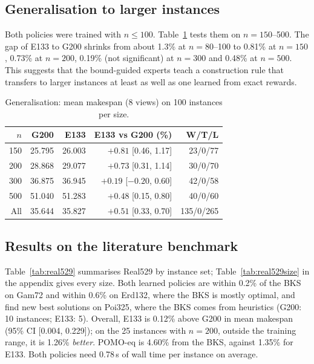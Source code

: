 \documentclass[preprint,review,12pt,authoryear]{elsarticle}
\begin{document}
\subsection{Generalisation to larger instances}\label{sec:generalisation}
Both policies were trained with $n\le100$. Table~\ref{tab:general} tests them on $n=150$--500. The gap of
E133 to G200 shrinks from about 1.3\% at $n=80$--100 to 0.81\% at $n=150$, 0.73\% at $n=200$, 0.19\% (not
significant) at $n=300$ and 0.48\% at $n=500$. This suggests that the bound-guided experts teach a
construction rule that transfers to larger instances at least as well as one learned from exact rewards.

\begin{table}[t]\centering\small
\caption{Generalisation: mean makespan (8 views) on 100 instances per size.}\label{tab:general}
\begin{tabular}{rrrrr}
\toprule
$n$ & G200 & E133 & E133 vs G200 (\%) & W/T/L \\
\midrule
150 & 25.795 & 26.003 & $+0.81$ [0.46, 1.17] & 23/0/77 \\
200 & 28.868 & 29.077 & $+0.73$ [0.31, 1.14] & 30/0/70 \\
300 & 36.875 & 36.945 & $+0.19$ [$-0.20$, 0.60] & 42/0/58 \\
500 & 51.040 & 51.283 & $+0.48$ [0.15, 0.80] & 40/0/60 \\
\midrule
All & 35.644 & 35.827 & $+0.51$ [0.33, 0.70] & 135/0/265 \\
\bottomrule
\end{tabular}
\end{table}

\subsection{Results on the literature benchmark}\label{sec:real529}
Table~\ref{tab:real529} summarises Real529 by instance set; Table~\ref{tab:real529size} in the appendix gives
every size. Both learned policies are within 0.2\% of the BKS on Gam72 and within 0.6\% on Erd132, where the BKS
is mostly optimal, and find new best solutions on Poi325, where the BKS comes from heuristics (G200: 10
instances; E133: 5). Overall, E133 is 0.12\% above G200 in mean makespan (95\% CI [0.004, 0.229]); on the 25
instances with $n=200$, outside the training range, it is 1.26\% \emph{better}. POMO-eq is 4.60\% from the BKS,
against 1.35\% for E133. Both policies need 0.78\,s of wall time per instance on average.
\end{document}
